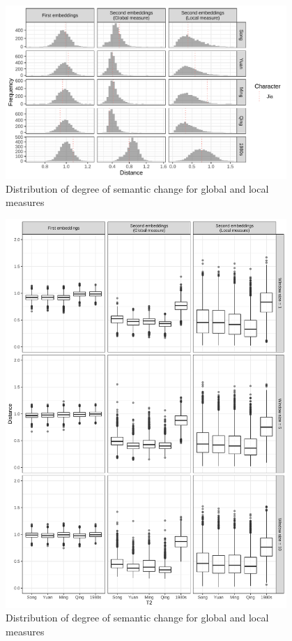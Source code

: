 \begin{figure}[H]
  \centering
  \includegraphics[width=0.95\textwidth,height=0.95\textheight,keepaspectratio]{figures_new/measures/dist_hist_w5.pdf}
  \caption{Distribution of degree of semantic change for global and local measures}
\end{figure}

\newpage
\begin{figure}[H]
    \centering
    \includegraphics[width=0.95\textwidth,height=0.95\textheight,keepaspectratio]{figures_new/measures/dist_boxplot.pdf}
    \caption{Distribution of degree of semantic change for global and local measures}
\end{figure}

